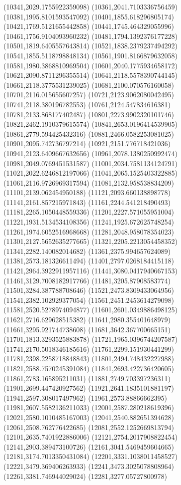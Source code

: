 {(10341,2029.1755922359098)
(10361,2041.7103336756459)
(10381,1995.8101593547092)
(10401,1855.618296805174)
(10421,1769.5121655442858)
(10441,1745.464329055996)
(10461,1756.9104093960232)
(10481,1794.1392376177228)
(10501,1819.6405557643814)
(10521,1838.2379237494292)
(10541,1855.5118798848134)
(10561,1901.8166879632058)
(10581,1980.3868810969504)
(10601,2040.1775934658172)
(10621,2090.8711296355514)
(10641,2118.5578390744145)
(10661,2118.3775531239025)
(10681,2100.070576160058)
(10701,2116.015655607257)
(10721,2123.9062080042495)
(10741,2118.380196782553)
(10761,2124.547834616381)
(10781,2133.868177402487)
(10801,2273.9902320101746)
(10821,2462.1910379615574)
(10841,2653.0196414539905)
(10861,2779.594425432316)
(10881,2466.0582253081025)
(10901,2095.742736797214)
(10921,2151.776718421036)
(10941,2123.6409667632656)
(10961,2078.1380250992474)
(10981,2049.0769451531587)
(11001,2034.7581134124791)
(11021,2022.6246812197066)
(11041,2065.1525403322885)
(11061,2116.9726969317594)
(11081,2132.958538834209)
(11101,2139.062454950188)
(11121,2093.660138898778)
(11141,2161.857215971843)
(11161,2244.541218490493)
(11181,2265.1050448559336)
(11201,2227.571055951004)
(11221,1931.5134534108356)
(11241,1925.672625748254)
(11261,1974.6052516968668)
(11281,2048.958078354023)
(11301,2127.5652635277665)
(11321,2205.2213054458352)
(11341,2282.140082014682)
(11361,2375.994657624089)
(11381,2573.181326611494)
(11401,2797.0268184415118)
(11421,2964.3922911957116)
(11441,3080.0417940667153)
(11461,3129.7008182917766)
(11481,3205.87908583774)
(11501,3284.387788708646)
(11521,2473.8309433064956)
(11541,2382.102929377054)
(11561,2451.2453614279098)
(11581,2520.5278974094877)
(11601,2601.0349886498125)
(11621,2716.629628515382)
(11641,2980.355401648979)
(11661,3295.921744738608)
(11681,3642.367700665151)
(11701,1813.3293525883878)
(11721,1965.0396744207587)
(11741,2170.5018346185616)
(11761,2299.151930441299)
(11781,2398.2258718848843)
(11801,2494.748432227988)
(11821,2588.7570245391084)
(11841,2693.422736420605)
(11861,2783.165895211031)
(11881,2749.703397236311)
(11901,2699.447420927562)
(11921,2641.1835101881197)
(11941,2597.308017497962)
(11961,2573.88866662395)
(11981,2607.5582136211033)
(12001,2587.280218619396)
(12021,2580.1010485167003)
(12041,2540.882651394628)
(12061,2508.762776422685)
(12081,2552.1252669813794)
(12101,2635.7401922886006)
(12121,2754.2017908822454)
(12141,2903.389473100726)
(12161,3041.5469459604665)
(12181,3174.7013350431084)
(12201,3331.1038011458527)
(12221,3479.369406263933)
(12241,3473.3025078808964)
(12261,3381.746944029024)
(12281,3277.05727800978)
}
